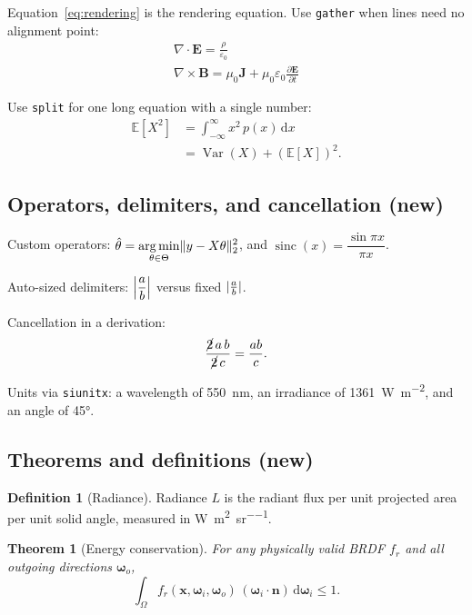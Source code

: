 \documentclass[11pt,a4paper]{article}
\newcommand{\Ex}[1]{\mathbb{E}\!\left[#1\right]}  %
\newcommand{\dd}[2]{\frac{\partial #1}{\partial #2}} %
\DeclareMathOperator*{\argmin}{arg\,min}          %
\DeclareMathOperator{\sinc}{sinc}
\DeclarePairedDelimiter{\abs}{\lvert}{\rvert}     %
\DeclarePairedDelimiter{\norm}{\lVert}{\rVert}
\theoremstyle{plain}
\newtheorem{theorem}{Theorem}[section]
\theoremstyle{definition}
\newtheorem{definition}{Definition}[section]
\theoremstyle{remark}
\begin{document}
Equation~\eqref{eq:rendering} is the rendering equation. Use \verb|gather| when
lines need no alignment point:
\begin{gather}
    \nabla \cdot \bm{E} = \frac{\rho}{\varepsilon_0} \\
    \nabla \times \bm{B} = \mu_0 \bm{J} + \mu_0\varepsilon_0 \dd{\bm{E}}{t}
\end{gather}

Use \verb|split| for one long equation with a single number:
\begin{equation}
\begin{split}
    \Ex{X^2} &= \int_{-\infty}^{\infty} x^2 \, p(x)\,\mathrm{d}x \\
             &= \operatorname{Var}(X) + \left(\Ex{X}\right)^2.
\end{split}
\end{equation}

\subsection{Operators, delimiters, and cancellation (new)}
Custom operators: $\displaystyle \hat{\theta} = \argmin_{\theta \in \Theta} \norm{y - X\theta}_2^2$,
and $\sinc(x) = \dfrac{\sin \pi x}{\pi x}$.

Auto-sized delimiters: $\abs*{\dfrac{a}{b}}$ versus fixed $\abs{\frac{a}{b}}$.

Cancellation in a derivation:
\[
\frac{\cancel{2}\,a\,b}{\cancel{2}\,c} = \frac{ab}{c}.
\]

Units via \texttt{siunitx}: a wavelength of \SI{550}{\nano\metre}, an irradiance
of \SI{1361}{\watt\per\square\metre}, and an angle of \ang{45}.

\subsection{Theorems and definitions (new)}

\begin{definition}[Radiance]
\label{def:radiance}
Radiance $L$ is the radiant flux per unit projected area per unit solid angle,
measured in \si{\watt\per\square\metre\per\steradian}.
\end{definition}

\begin{theorem}[Energy conservation]
\label{thm:energy}
For any physically valid BRDF $f_r$ and all outgoing directions $\bm{\omega}_o$,
\[
\int_{\Omega} f_r(\bm{x},\bm{\omega}_i,\bm{\omega}_o)\,
(\bm{\omega}_i \cdot \bm{n}) \, \mathrm{d}\bm{\omega}_i \le 1 .
\]
\end{theorem}
\end{document}
